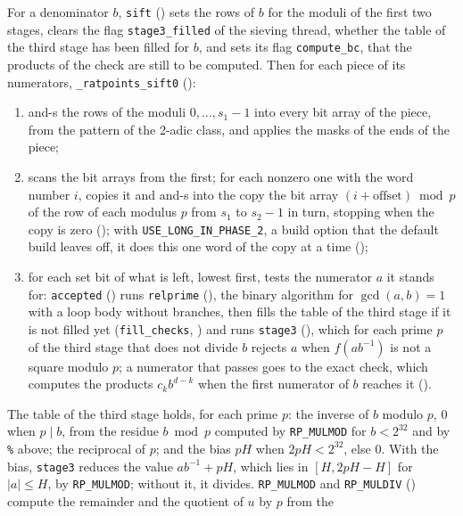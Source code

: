 For a denominator $b$, \verb|sift| () sets the rows of $b$ for
the moduli of the first two stages, clears the flag \verb|stage3_filled| of the sieving thread,
whether the table of the third stage has been filled for $b$, and sets its flag \verb|compute_bc|,
that the products of the check are still to be computed. Then for each piece of its numerators,
\verb|_ratpoints_sift0| ():
\begin{enumerate}
  \item and-s the rows of the moduli $0, \dots, s_1 - 1$ into every bit array of the piece, from the
    pattern of the 2-adic class, and applies the masks of the ends of the piece;
  \item scans the bit arrays from the first; for each nonzero one with the word number $i$, copies
    it and and-s into the copy the bit array $(i + \mathrm{offset}) \bmod p$ of the row of each
    modulus $p$ from $s_1$ to $s_2 - 1$ in turn, stopping when the copy is zero
    (); with \verb|USE_LONG_IN_PHASE_2|, a build option that the default
    build leaves off, it does this one word of the copy at a time ();
  \item for each set bit of what is left, lowest first, tests the numerator $a$ it stands for:
    \verb|accepted| () runs \verb|relprime| (),
    the binary algorithm for $\gcd(a, b) = 1$ with a loop body without branches, then fills the
    table of the third stage if it is not filled yet (\verb|fill_checks|,
    ) and runs \verb|stage3| (), which for each
    prime $p$ of the third stage that does not divide $b$ rejects $a$ when $f(a b^{-1})$ is not a
    square modulo $p$; a numerator that passes goes to the exact check, which computes the products
    $c_k b^{d - k}$ when the first numerator of $b$ reaches it
    ().
\end{enumerate}
The table of the third stage holds, for each prime $p$: the inverse of $b$ modulo $p$, $0$ when $p
\mid b$, from the residue $b \bmod p$ computed by \verb|RP_MULMOD| for $b < 2^{32}$ and by \verb|%|
above; the reciprocal of $p$; and the bias $p H$ when $2 p H < 2^{32}$, else $0$. With the bias,
\verb|stage3| reduces the value $a b^{-1} + p H$, which lies in $[H, 2 p H - H]$ for $|a| \le H$, by
\verb|RP_MULMOD|; without it, it divides. \verb|RP_MULMOD| and \verb|RP_MULDIV|
() compute the remainder and the quotient of $u$ by $p$ from the
